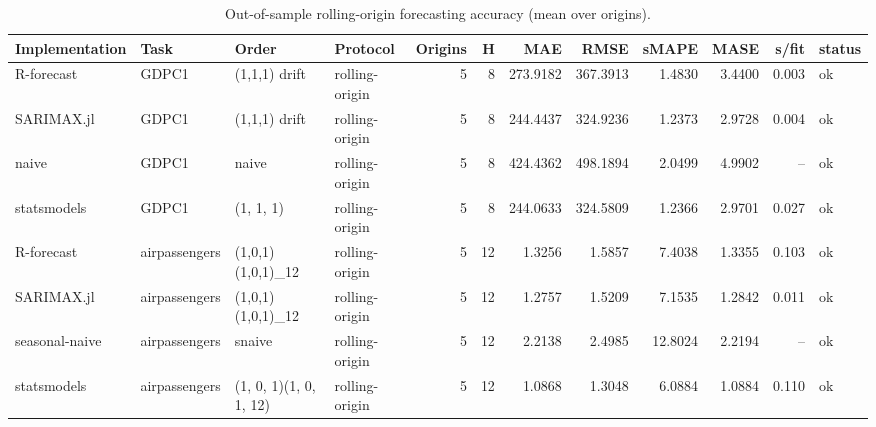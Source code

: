\begin{table}[t]
\centering
\caption{Out-of-sample rolling-origin forecasting accuracy (mean over origins).}
\label{tab:forecast_oos}
\begin{tabular}{llllrrrrrrrl}
\hline
Implementation & Task & Order & Protocol & Origins & H & MAE & RMSE & sMAPE & MASE & s/fit & status \\
\hline
R-forecast & GDPC1 & (1,1,1) drift & rolling-origin & 5 & 8 & 273.9182 & 367.3913 & 1.4830 & 3.4400 & 0.003 & ok \\
SARIMAX.jl & GDPC1 & (1,1,1) drift & rolling-origin & 5 & 8 & 244.4437 & 324.9236 & 1.2373 & 2.9728 & 0.004 & ok \\
naive & GDPC1 & naive & rolling-origin & 5 & 8 & 424.4362 & 498.1894 & 2.0499 & 4.9902 & -- & ok \\
statsmodels & GDPC1 & (1, 1, 1) & rolling-origin & 5 & 8 & 244.0633 & 324.5809 & 1.2366 & 2.9701 & 0.027 & ok \\
R-forecast & airpassengers & (1,0,1)(1,0,1)\_12 & rolling-origin & 5 & 12 & 1.3256 & 1.5857 & 7.4038 & 1.3355 & 0.103 & ok \\
SARIMAX.jl & airpassengers & (1,0,1)(1,0,1)\_12 & rolling-origin & 5 & 12 & 1.2757 & 1.5209 & 7.1535 & 1.2842 & 0.011 & ok \\
seasonal-naive & airpassengers & snaive & rolling-origin & 5 & 12 & 2.2138 & 2.4985 & 12.8024 & 2.2194 & -- & ok \\
statsmodels & airpassengers & (1, 0, 1)(1, 0, 1, 12) & rolling-origin & 5 & 12 & 1.0868 & 1.3048 & 6.0884 & 1.0884 & 0.110 & ok \\
\hline
\end{tabular}
\end{table}